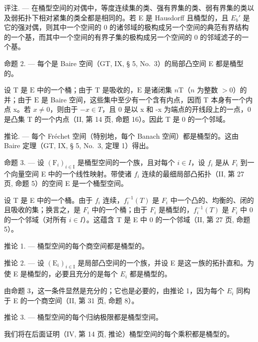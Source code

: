 评注. --- 在桶型空间的对偶中，等度连续集的类、强有界集的类、弱有界集的类以及弱拓扑下相对紧集的类全都是相同的。若 E 是 Hausdorff 且桶型的，且 \(E_{b}'\) 是它的强对偶，则其中一个空间的 0 的诸邻域的极构成另一个空间的典范有界结构的一个基，而其中一个空间的有界子集的极构成另一个空间的 0 的邻域滤子的一个基。

命题 2. --- 每个是 Baire 空间（GT, IX, § 5, No.~3）的局部凸空间 E 都是桶型的。

设 \(\mathrm{T}\) 是 \(\mathrm{E}\) 中的一个桶；由于 \(\mathrm{T}\) 是吸收的，\(\mathrm{E}\) 是诸闭集 \(n\mathrm{T}\)（\(n\) 为整数 \(> 0\)）的并；由于 \(\mathrm{E}\) 是 Baire 空间，这些集中至少有一个含有内点，因而 T 本身有一个内点 x。若 \(x \neq 0\)，则由于 \(-x \in T\)，且 0 是以 x 和 -x 为端点的开线段上的一点，0 是凸集 T 的一个内点（II, 第 14 页, 命题 16）。因此 T 是 0 的一个邻域。

推论. --- 每个 Fréchet 空间（特别地，每个 Banach 空间）都是桶型的。这由 Baire 定理（GT, IX, § 5, No.~3, 定理 1）得出。

命题 3. --- 设 \((\mathrm{F}_{i})_{i\in\mathrm{I}}\) 是桶型空间的一个族，且对每个 \(i\in I\)，设 \(f_{i}\) 是从 \(F_{i}\) 到一个向量空间 E 中的一个线性映射。带使诸 \(f_{i}\) 连续的最细局部凸拓扑（II, 第 27 页, 命题 5）的空间 E 是一个桶型空间。

设 T 是 E 中的一个桶。由于 \(f_{i}\) 连续，\(f_{i}^{-1}(T)\) 是 \(F_{i}\) 中一个凸的、均衡的、闭的且吸收的集；换言之，是 \(F_{i}\) 中的一个桶；由于 \(F_{i}\) 是桶型的，\(f_{i}^{-1}(T)\) 是 \(F_{i}\) 中 0 的一个邻域（对所有 \(i \in I\)）。这蕴含 T 是 E 中 0 的一个邻域（II, 第 27 页, 命题 5）。

推论 1. --- 桶型空间的每个商空间都是桶型的。

推论 2. --- 设 \((\mathrm{E}_{i})_{i\in\mathrm{I}}\) 是局部凸空间的一个族，并设 E 是这一族的拓扑直和。为使 E 是桶型的，必要且充分的是每个 \(E_{i}\) 都是桶型的。

由命题 3，这一条件显然是充分的；它也是必要的，由推论 1，因为每个 \(E_{i}\) 同构于 E 的一个商空间（II, 第 31 页, 命题 8）。

推论 3. --- 桶型空间的每个归纳极限都是桶型空间。

我们将在后面证明（IV, 第 14 页, 推论）桶型空间的每个乘积都是桶型的。

